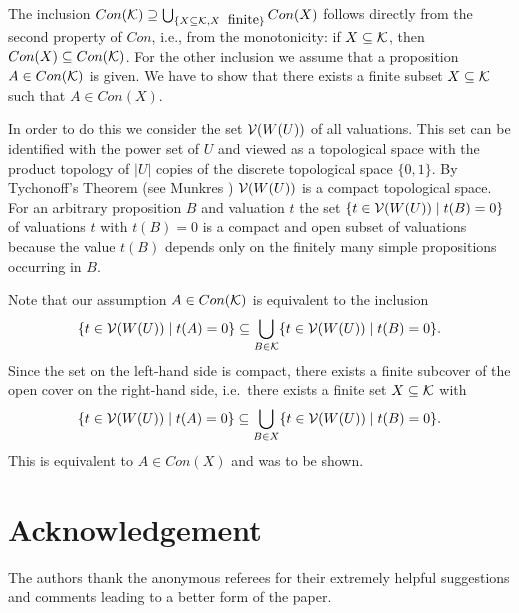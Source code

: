 The inclusion
$Con({\cal K}) \supseteq \bigcup_{\{X\subseteq {\cal K}, X
\;\mbox{ finite}\}} Con(X)$ follows directly from
the second property of $Con$,
i.e., from the monotonicity:
if $X \subseteq {\cal K}$, then $Con(X) \subseteq Con ({\cal K})$.
For the other inclusion
we assume that a proposition $A \in Con({\cal K})$
is given. We have to show that there exists a finite
subset $X \subseteq {\cal K}$ such that $A \in Con(X)$.

In order to do this we consider the set ${\cal V}(W(U))$
of all valuations. This set can be identified with the power
set of $U$ and viewed as a topological space with
the product topology of $|U|$ copies of the
discrete topological space $\{0,1\}$. By Tychonoff's
Theorem (see Munkres \cite{munkres-75})
${\cal V}(W(U))$ is a compact topological space.
For an arbitrary proposition $B$
and valuation $t$ the set
$\{t \in {\cal V}(W(U)) \mid t(B)=0\}$
of valuations $t$ with $t(B)=0$
is a compact and open subset of valuations
because the value $t(B)$ depends only on the
finitely many simple propositions occurring in $B$.

Note that our assumption $A \in Con({\cal K})$ is
equivalent to the inclusion
\[ \{t \in {\cal V}(W(U)) \mid t(A)=0\}
\subseteq \bigcup_{B \in {\cal K}}
  \{t \in {\cal V}(W(U)) \mid t(B)=0\}.\]
Since the set on the left-hand side is compact, there exists
a finite subcover of the open cover on the right-hand side,
i.e.\ there exists a finite set $X \subseteq {\cal K}$
with
\[ \{t \in {\cal V}(W(U)) \mid t(A)=0\}
\subseteq \bigcup_{B \in X}
  \{t \in {\cal V}(W(U)) \mid t(B)=0\}.\]
This is equivalent to $A \in Con(X)$ and was to
be shown.


\section*{Acknowledgement}

The authors thank the anonymous referees for their extremely helpful
suggestions and comments leading to a better form of the paper.


%
%


